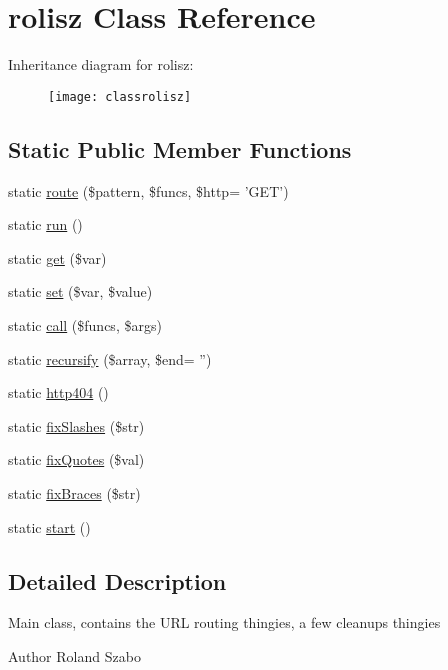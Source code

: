 \hypertarget{classrolisz}{
\section{rolisz Class Reference}
\label{classrolisz}
}
Inheritance diagram for rolisz:\begin{figure}[H]
\begin{center}
\leavevmode
\texttt{[image: classrolisz]}
\end{center}
\end{figure}
\subsection*{Static Public Member Functions}
\begin{DoxyCompactItemize}
\item 
static \hyperlink{classrolisz_ae9dbb7550b587e4e19bca121029e088b}{route} (\$pattern, \$funcs, \$http= 'GET')
\item 
static \hyperlink{classrolisz_ad3a572002fd350672b531756f7306e8f}{run} ()
\item 
static \hyperlink{classrolisz_a0e8f3e2708d9f0c6ee7b54599f57ea34}{get} (\$var)
\item 
static \hyperlink{classrolisz_a1d7c8d5e3d237bc3217650f79ab35bd3}{set} (\$var, \$value)
\item 
static \hyperlink{classrolisz_af732c33c326c863efe6dd2cccb21a9a5}{call} (\$funcs, \$args)
\item 
static \hyperlink{classrolisz_ad1b6efe27562cb6620a179f5688417bb}{recursify} (\$array, \$end= '')
\item 
static \hyperlink{classrolisz_a6fdc4c9fc517c619d860c7e91d17b02d}{http404} ()
\item 
static \hyperlink{classrolisz_a13d0c0500b75a5bdd849a4a55ba8e2b1}{fixSlashes} (\$str)
\item 
static \hyperlink{classrolisz_a031dd360aea86d999059dbfd18687973}{fixQuotes} (\$val)
\item 
static \hyperlink{classrolisz_ab8e0e9e5ffd59108f38efefe79511c5b}{fixBraces} (\$str)
\item 
static \hyperlink{classrolisz_a146085d0f3a9d17bdcd7f3d4081d8c0d}{start} ()
\end{DoxyCompactItemize}


\subsection{Detailed Description}
Main class, contains the URL routing thingies, a few cleanups thingies \begin{DoxyAuthor}{Author}
Roland Szabo 
\end{DoxyAuthor}


